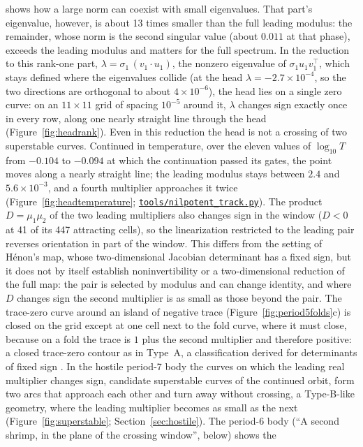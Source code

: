 \documentclass[11pt,letterpaper]{article}
\newcommand{\repourl}{https://github.com/tdj28/neural-shrimp}
\newcommand{\reporef}{arxiv-v1}
\newcommand{\repo}[1]{\href{\repourl/blob/\reporef/#1}{\nolinkurl{#1}}}
\begin{document}
shows how a large norm can coexist with small eigenvalues. That part's eigenvalue, however, is about 13 times smaller
than the full leading modulus: the remainder, whose norm is the second singular value (about $0.011$ at that phase),
exceeds the leading modulus and matters for the full spectrum. In the reduction to this rank-one part, $\lambda=\sigma_1\,(v_1\cdot u_1)$, the nonzero eigenvalue of
$\sigma_1u_1v_1^{\top}$, which stays defined where the eigenvalues collide (at the head $\lambda=-2.7\times10^{-4}$, so
the two directions are orthogonal to about $4\times10^{-6}$), the head lies on a single zero curve: on an
$11\times11$ grid of spacing $10^{-5}$ around it, $\lambda$ changes sign exactly once in every row, along one nearly
straight line through the head (Figure~\ref{fig:headrank}). Even in this reduction the head is not a crossing of two
superstable curves. Continued in temperature, over the eleven values of $\log_{10}T$ from $-0.104$ to
$-0.094$ at which the continuation passed its gates, the point moves along a nearly straight line; the leading modulus
stays between $2.4$ and $5.6\times10^{-3}$, and a fourth multiplier approaches it twice (Figure~\ref{fig:headtemperature};
\repo{tools/nilpotent_track.py}). The product $D=\mu_1\mu_2$ of the two leading multipliers also changes sign in the
window ($D<0$ at 41 of its 447 attracting cells), so the linearization restricted to the leading pair reverses
orientation in part of the window. This differs from the setting of H\'enon's map, whose two-dimensional Jacobian
determinant has a fixed sign, but it does not by itself establish noninvertibility or a two-dimensional reduction of
the full map: the pair is selected by modulus and can change identity, and where $D$ changes sign the second
multiplier is as small as those beyond the pair. The trace-zero curve around an island of negative trace (Figure~\ref{fig:period5folds}c)
is closed on the grid except at one cell next to the fold curve, where it must close, because on a fold the trace is
$1$ plus the second multiplier and therefore positive: a closed trace-zero contour as in Type~A, a classification
derived for determinants of fixed sign \cite{facanha2013endoskeletons}. In the
hostile period-7 body the curves on which the leading real multiplier changes sign, candidate superstable curves of
the continued orbit, form two arcs that approach each other and turn away without crossing, a Type-B-like geometry,
where the leading multiplier becomes as small as the next (Figure~\ref{fig:superstable}; Section~\ref{sec:hostile}). The period-6 body (``A second shrimp, in the plane of the crossing window'', below) shows the
\end{document}
